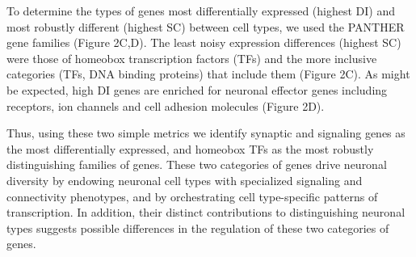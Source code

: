 To determine the types of genes most differentially expressed (highest DI) and most robustly different (highest SC) between cell types, we used the PANTHER gene families (Figure 2C,D). The least noisy expression differences (highest SC) were those of homeobox transcription factors (TFs) and the more inclusive categories (TFs, DNA binding proteins) that include them (Figure 2C). As might be expected, high DI genes are enriched for neuronal effector genes including receptors, ion channels and cell adhesion molecules (Figure 2D). 

Thus, using these two simple metrics we identify synaptic and signaling genes as the most differentially expressed, and homeobox TFs as the most robustly distinguishing families of genes. These two categories of genes drive neuronal diversity by endowing neuronal cell types with specialized signaling and connectivity phenotypes, and by orchestrating cell type-specific patterns of transcription. In addition, their distinct contributions to distinguishing neuronal types suggests possible differences in the regulation of these two categories of genes. 


